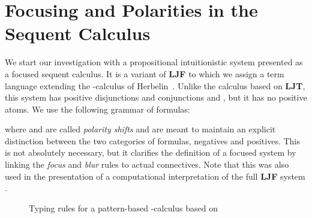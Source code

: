 \documentclass[creativecommons]{eptcs/eptcs}
\newcommand{\LJT}{\textbf{{LJT}}\xspace}
\newcommand{\LJF}{\textbf{{LJF}}\xspace}
\begin{document}
\section{Focusing and Polarities in the Sequent Calculus}
\label{sec:focpsc}

We start our investigation with a propositional intuitionistic system presented
as a focused sequent calculus. It is a variant of \LJF \cite{liang:miller:09:focpol}
to which we assign a term language extending the -calculus of
Herbelin~\cite{herbelin:94:chseq}. Unlike the calculus based on \LJT, this system
has positive disjunctions and conjunctions  and , but it has
no positive atoms. We use the following grammar of formulas:

where  and  are called \emph{polarity shifts} and are meant to
maintain an explicit distinction between the two categories of formulas,
negatives and positives. This is not absolutely necessary, but it clarifies
the definition of a focused system by linking the \emph{focus} and \emph{blur}
rules to actual connectives. Note that this was also used in the presentation
of a computational interpretation of the full \LJF system
\cite{brockn:guenot:gustafsson:15:ljfoc}.

\newpage

\begin{figure}[t]
\centerline{
}
\caption{Typing rules for a pattern-based -calculus based on }
\label{figproplam}
\end{figure}
\end{document}
